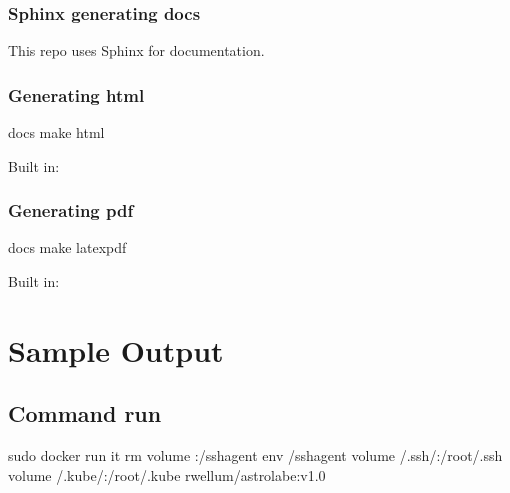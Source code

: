 \documentclass[letterpaper,10pt,english]{sphinxmanual}
\begin{document}
\subsection{Sphinx generating docs}
\label{\detokenize{README:sphinx-generating-docs}}
This repo uses Sphinx for documentation.


\subsection{Generating html}
\label{\detokenize{README:generating-html}}
\begin{sphinxVerbatim}[commandchars=\\\{\}]
 docs
make html
\end{sphinxVerbatim}

Built in: 


\subsection{Generating pdf}
\label{\detokenize{README:generating-pdf}}
\begin{sphinxVerbatim}[commandchars=\\\{\}]
 docs
make latexpdf
\end{sphinxVerbatim}

Built in: 


\chapter{Sample Output}
\label{\detokenize{sample_output:sample-output}}\label{\detokenize{sample_output::doc}}

\section{Command run}
\label{\detokenize{sample_output:command-run}}
\begin{sphinxVerbatim}[commandchars=\\\{\}]
sudo docker run \PYGZhy{}it \PYGZhy{}\PYGZhy{}rm \PYGZhy{}\PYGZhy{}volume :/ssh\PYGZhy{}agent 
\PYGZhy{}\PYGZhy{}env /ssh\PYGZhy{}agent \PYGZhy{}\PYGZhy{}volume /.ssh/:/root/.ssh 
\PYGZhy{}\PYGZhy{}volume /.kube/:/root/.kube rwellum/astrolabe:v1.0
\end{sphinxVerbatim}
\end{document}
